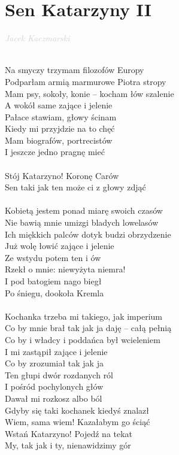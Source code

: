 \documentclass[a5paper, 10pt]{book}
\begin{document}
\newpage
\section{Sen Katarzyny II}\textcolor{lightgray}{\textit{Jacek Kaczmarski}}\\~\\
\begin{minipage}[t]{0.8\textwidth}
Na smyczy trzymam filozofów Europy\\
Podparłam armią marmurowe Piotra stropy\\
Mam psy, sokoły, konie – kocham łów szalenie\\
A wokół same zające i jelenie\\
Pałace stawiam, głowy ścinam\\
Kiedy mi przyjdzie na to chęć\\
Mam biografów, portrecistów\\
I jeszcze jedno pragnę mieć\\
\\
\hspace*{5mm}Stój Katarzyno! Koronę Carów\\
\hspace*{5mm}Sen taki jak ten może ci z głowy zdjąć\\
\\
Kobietą jestem ponad miarę swoich czasów\\
Nie bawią mnie umizgi bladych lowelasów\\
Ich miękkich palców dotyk budzi obrzydzenie\\
Już wolę łowić zające i jelenie\\
Ze wstydu potem ten i ów\\
Rzekł o mnie: niewyżyta niemra!\\
I pod batogiem nago biegł\\
Po śniegu, dookoła Kremla\\
\\
Kochanka trzeba mi takiego, jak imperium\\
Co by mnie brał tak jak ja daję – całą pełnią\\
Co by i władcy i poddańca był wcieleniem\\
I mi zastąpił zające i jelenie\\
Co by zrozumiał tak jak ja\\
Ten głupi dwór rozdanych ról\\
I pośród pochylonych głów\\
Dawał mi rozkosz albo ból\\

\hspace*{5mm}Gdyby się taki kochanek kiedyś znalazł\\
\hspace*{5mm}Wiem, sama wiem! Kazałabym go ściąć\\

\hspace*{3mm}Wstań Katarzyno! Pojedź na tekat\\
\hspace*{3mm}My, tak jak i ty, nienawidzimy gór\\

\end{minipage}
\end{document}
